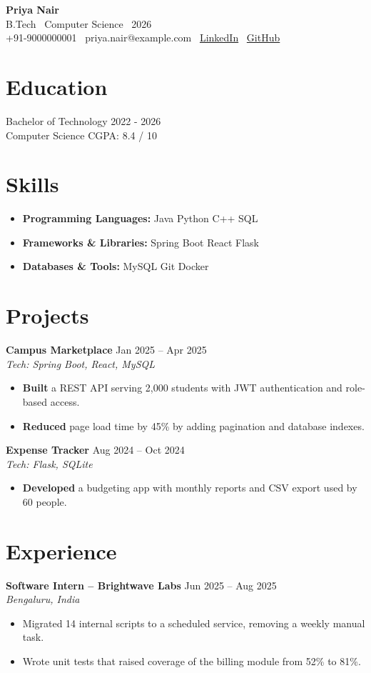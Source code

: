 \documentclass[11pt,a4paper]{article}
\begin{document}
\begin{center}
    {\Large \textbf{Priya Nair}} \\[1pt]
    B.Tech \textbar\ Computer Science \textbar\ 2026 \\[1pt]
    +91-9000000001 \textbar\ priya.nair@example.com \textbar\
    \href{https://www.linkedin.com/in/priya-nair-example}{LinkedIn} \textbar\
    \href{https://github.com/priya-nair-example}{GitHub}
\end{center}
\section*{Education}
Bachelor of Technology \hfill 2022 - 2026 \\
Computer Science \hfill CGPA: 8.4 / 10
\section*{Skills}
\begin{itemize}
    \item \textbf{Programming Languages:} Java \textbullet{} Python \textbullet{} C++ \textbullet{} SQL
    \item \textbf{Frameworks \& Libraries:} Spring Boot \textbullet{} React \textbullet{} Flask
    \item \textbf{Databases \& Tools:} MySQL \textbullet{} Git \textbullet{} Docker
\end{itemize}
\section*{Projects}
\textbf{Campus Marketplace} \hfill Jan 2025 -- Apr 2025 \\
\textit{Tech: Spring Boot, React, MySQL}
\begin{itemize}
    \item \textbf{Built} a REST API serving 2,000 students with JWT authentication and role-based access.
    \item \textbf{Reduced} page load time by 45\% by adding pagination and database indexes.
\end{itemize}
\vspace{4pt}
\textbf{Expense Tracker} \hfill Aug 2024 -- Oct 2024 \\
\textit{Tech: Flask, SQLite}
\begin{itemize}
    \item \textbf{Developed} a budgeting app with monthly reports and CSV export used by 60 people.
\end{itemize}
\section*{Experience}
\textbf{Software Intern -- Brightwave Labs} \hfill Jun 2025 -- Aug 2025 \\
\textit{Bengaluru, India}
\begin{itemize}
    \item Migrated 14 internal scripts to a scheduled service, removing a weekly manual task.
    \item Wrote unit tests that raised coverage of the billing module from 52\% to 81\%.
\end{itemize}
\end{document}
